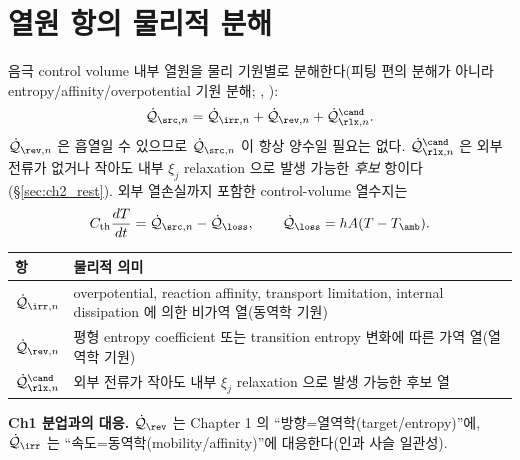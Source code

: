 \section{열원 항의 물리적 분해}\label{sec:ch2_decomp}
음극 control volume 내부 열원을 물리 기원별로 분해한다(피팅 편의 분해가 아니라 entropy/affinity/overpotential
기원 분해; \cite{bernardi1985,rao1997}, ):
\begin{equation}
\dot{\mathcal Q}_{\src,n}=\dot{\mathcal Q}_{\irr,n}+\dot{\mathcal Q}_{\rev,n}+\dot{\mathcal Q}_{\rlx,n}^{\cand}.
\label{eq:ch2_srcdecomp}
\end{equation}
$\dot{\mathcal Q}_{\rev,n}$ 은 흡열일 수 있으므로 $\dot{\mathcal Q}_{\src,n}$ 이 항상 양수일 필요는 없다.
$\dot{\mathcal Q}_{\rlx,n}^{\cand}$ 은 외부 전류가 없거나 작아도 내부 $\xi_j$ relaxation 으로 발생 가능한
\emph{후보} 항이다(\S\ref{sec:ch2_rest}). 외부 열손실까지 포함한 control-volume 열수지는
\begin{equation}
C_{\mathrm{th}}\frac{dT}{dt}=\dot{\mathcal Q}_{\src,n}-\dot{\mathcal Q}_{\loss},\qquad
\dot{\mathcal Q}_{\loss}=hA(T-T_{\amb}).
\label{eq:ch2_balance}
\end{equation}
\begin{longtable}{p{} p{}}
\toprule 항 & 물리적 의미 \\ \midrule \endhead
$\dot{\mathcal Q}_{\irr,n}$ & overpotential, reaction affinity, transport limitation, internal dissipation 에 의한 비가역 열(동역학 기원) \\
$\dot{\mathcal Q}_{\rev,n}$ & 평형 entropy coefficient 또는 transition entropy 변화에 따른 가역 열(열역학 기원) \\
$\dot{\mathcal Q}_{\rlx,n}^{\cand}$ & 외부 전류가 작아도 내부 $\xi_j$ relaxation 으로 발생 가능한 후보 열 \\
\bottomrule
\end{longtable}
\textbf{Ch1 분업과의 대응.} $\dot{\mathcal Q}_{\rev}$ 는 Chapter 1 의 ``방향=열역학(target/entropy)''에,
$\dot{\mathcal Q}_{\irr}$ 는 ``속도=동역학(mobility/affinity)''에 대응한다(인과 사슬 일관성).

